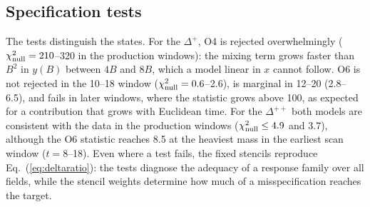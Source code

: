 \documentclass[aps,prd,preprint,nofootinbib,floatfix]{revtex4-2}
\begin{document}
\begin{table}[t]
\caption{Absolute control: $r_0=\mu_{\Delta^0}/\mu_{\Delta^{++}}$, exactly zero at first order, in units of $10^{-4}$, with nested-jackknife errors and deviations in standard errors, window 10--18. Fixed stencils and per-state covariance-optimized estimators (noise-inclusive covariance, fixed weights).}
\label{tab:delta0}
\centering
\setlength{\tabcolsep}{3pt}
\end{table}

\subsection{Specification tests}

The tests distinguish the states. For the $\Delta^+$, O4 is rejected overwhelmingly ($\chi^2_{\rm null}=210$--320 in the production windows): the mixing term grows faster than $B^2$ in $y(B)$ between $4B$ and $8B$, which a model linear in $x$ cannot follow. O6 is not rejected in the 10--18 window ($\chi^2_{\rm null}=0.6$--2.6), is marginal in 12--20 (2.8--6.5), and fails in later windows, where the statistic grows above 100, as expected for a contribution that grows with Euclidean time. For the $\Delta^{++}$ both models are consistent with the data in the production windows ($\chi^2_{\rm null}\le4.9$ and 3.7), although the O6 statistic reaches 8.5 at the heaviest mass in the earliest scan window ($t=8$--18). Even where a test fails, the fixed stencils reproduce Eq.~(\ref{eq:deltaratio}): the tests diagnose the adequacy of a response family over all fields, while the stencil weights determine how much of a misspecification reaches the target.
\end{document}
